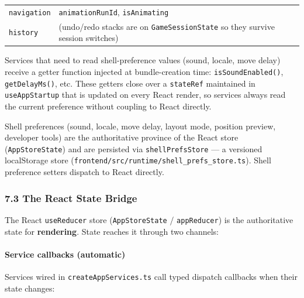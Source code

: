 \documentclass[]{article}
\let\oldparagraph\paragraph
\renewcommand{\paragraph}[1]{\oldparagraph{#1}\mbox{}}
\begin{document}
\begin{longtable}[]{@{}ll@{}}
\begin{minipage}[t]{0.05\columnwidth}\raggedright\strut
\texttt{navigation}\strut
\end{minipage} & \begin{minipage}[t]{0.05\columnwidth}\raggedright\strut
\texttt{animationRunId}, \texttt{isAnimating}\strut
\end{minipage}\tabularnewline
\begin{minipage}[t]{0.05\columnwidth}\raggedright\strut
\texttt{history}\strut
\end{minipage} & \begin{minipage}[t]{0.05\columnwidth}\raggedright\strut
(undo/redo stacks are on \texttt{GameSessionState} so they survive
session switches)\strut
\end{minipage}\tabularnewline
\bottomrule
\end{longtable}

Services that need to read shell-preference values (sound, locale, move
delay) receive a getter function injected at bundle-creation time:
\texttt{isSoundEnabled()}, \texttt{getDelayMs()}, etc. These getters
close over a \texttt{stateRef} maintained in \texttt{useAppStartup} that
is updated on every React render, so services always read the current
preference without coupling to React directly.

Shell preferences (sound, locale, move delay, layout mode, position
preview, developer tools) are the authoritative province of the React
store (\texttt{AppStoreState}) and are persisted via
\texttt{shellPrefsStore} --- a versioned localStorage store
(\texttt{frontend/src/runtime/shell\_prefs\_store.ts}). Shell preference
setters dispatch to React directly.

\subsubsection{7.3 The React State Bridge}\label{the-react-state-bridge}

The React \texttt{useReducer} store (\texttt{AppStoreState} /
\texttt{appReducer}) is the authoritative state for \textbf{rendering}.
State reaches it through two channels:

\paragraph{Service callbacks
(automatic)}\label{service-callbacks-automatic}

Services wired in \texttt{createAppServices.ts} call typed dispatch
callbacks when their state changes:
\end{document}

